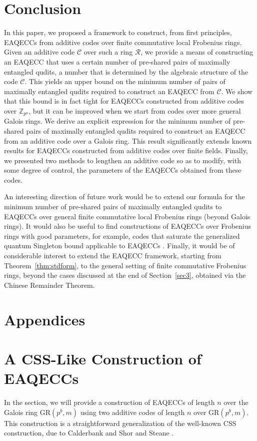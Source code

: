 \documentclass{article}
\theoremstyle{remark}
\theoremstyle{definition}
\numberwithin{equation}{section}
\begin{document}
\section{Conclusion} \label{sec6}


In this paper, we proposed a framework to construct, from first principles, EAQECCs from additive codes over finite commutative local Frobenius rings. Given an additive code $\mathcal{C}$ over such a ring $\mathcal{R}$, we provide a means of constructing an EAQECC that uses a certain number of pre-shared pairs of maximally entangled qudits, a number that is determined by the algebraic structure of the code $\mathcal{C}$. This yields an upper bound on the minimum number of pairs of maximally entangled qudits required to construct an EAQECC from $\mathcal{C}$. We show that this bound is in fact tight for EAQECCs constructed from additive codes over $\mathbb{Z}_{p^a}$, but it can be improved when we start from codes over more general Galois rings. We derive an explicit expression for the minimum number of pre-shared pairs of maximally entangled qudits required to construct an EAQECC from an additive code over a Galois ring. This result significantly extends known results for EAQECCs constructed from additive codes over finite fields. Finally, we presented two methods to lengthen an additive code so as to modify, with some degree of control, the parameters of the EAQECCs obtained from these codes.

An interesting direction of future work would be to extend our formula for the minimum number of pre-shared pairs of maximally entangled qudits to EAQECCs over general finite commutative local Frobenius rings (beyond Galois rings). It would also be useful to find constructions of EAQECCs over Frobenius rings with good parameters, for example, codes that saturate the generalized quantum Singleton bound applicable to EAQECCs \cite{GHW21}. Finally, it would be of considerable interest to extend the EAQECC framework, starting from Theorem~\ref{thm:stdform}, to the general setting of finite commutative Frobenius rings, beyond the cases discussed at the end of Section~\ref{sec3}, obtained via the Chinese Remainder Theorem.

\section*{Appendices}
\appendix
\section{A CSS-Like Construction of EAQECCs} \label{app:CSS}
In the section, we will provide a construction of EAQECCs of length $n$ over the Galois ring $\text{GR}(p^b,m)$ using two additive codes of length $n$ over $\text{GR}(p^b,m).$ This construction is a straightforward generalization of the well-known CSS construction, due to Calderbank and Shor \cite{calderbank} and Steane \cite{steane}.   
\end{document}
